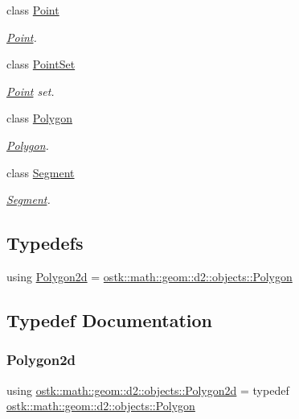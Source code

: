 \begin{DoxyCompactItemize}
class \hyperlink{classostk_1_1math_1_1geom_1_1d2_1_1objects_1_1_point}{Point}
\begin{DoxyCompactList}\small\item\em \hyperlink{classostk_1_1math_1_1geom_1_1d2_1_1objects_1_1_point}{Point}. \end{DoxyCompactList}\item 
class \hyperlink{classostk_1_1math_1_1geom_1_1d2_1_1objects_1_1_point_set}{Point\+Set}
\begin{DoxyCompactList}\small\item\em \hyperlink{classostk_1_1math_1_1geom_1_1d2_1_1objects_1_1_point}{Point} set. \end{DoxyCompactList}\item 
class \hyperlink{classostk_1_1math_1_1geom_1_1d2_1_1objects_1_1_polygon}{Polygon}
\begin{DoxyCompactList}\small\item\em \hyperlink{classostk_1_1math_1_1geom_1_1d2_1_1objects_1_1_polygon}{Polygon}. \end{DoxyCompactList}\item 
class \hyperlink{classostk_1_1math_1_1geom_1_1d2_1_1objects_1_1_segment}{Segment}
\begin{DoxyCompactList}\small\item\em \hyperlink{classostk_1_1math_1_1geom_1_1d2_1_1objects_1_1_segment}{Segment}. \end{DoxyCompactList}\end{DoxyCompactItemize}
\subsection*{Typedefs}
\begin{DoxyCompactItemize}
\item 
using \hyperlink{namespaceostk_1_1math_1_1geom_1_1d2_1_1objects_a5786a3021d23f9c64937e263a2da9d27}{Polygon2d} = \hyperlink{classostk_1_1math_1_1geom_1_1d2_1_1objects_1_1_polygon}{ostk\+::math\+::geom\+::d2\+::objects\+::\+Polygon}
\end{DoxyCompactItemize}


\subsection{Typedef Documentation}
\mbox{\label{namespaceostk_1_1math_1_1geom_1_1d2_1_1objects_a5786a3021d23f9c64937e263a2da9d27}} 
\subsubsection{\texorpdfstring{Polygon2d}{Polygon2d}}
{\footnotesize\ttfamily using \hyperlink{namespaceostk_1_1math_1_1geom_1_1d2_1_1objects_a5786a3021d23f9c64937e263a2da9d27}{ostk\+::math\+::geom\+::d2\+::objects\+::\+Polygon2d} = typedef \hyperlink{classostk_1_1math_1_1geom_1_1d2_1_1objects_1_1_polygon}{ostk\+::math\+::geom\+::d2\+::objects\+::\+Polygon}}

